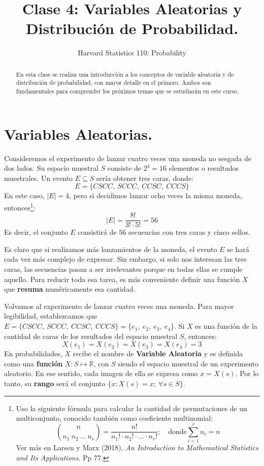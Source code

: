 \documentclass[12pt]{article}
\title{Clase 4: Variables Aleatorias y Distribución de Probabilidad.}
\author{Harvard Statistics 110: Probability}
\date{}
\begin{document}
\maketitle

\begin{abstract}
\noindent En esta clase se realiza una introducción a los conceptos de variable aleatoria y de distribución de probabilidad, con mayor detalle en el primero. Ambos son fundamentales para comprender los próximos temas que se estudiarán en este curso.
\end{abstract}

\newcommand{\R}{\mathbb{R}}

\section{Variables Aleatorias.}

Consideremos el experimento de lanzar cuatro veces una moneda no sesgada de dos lados. Su espacio muestral $S$ consiste de $2^{4} = 16$ elementos o resultados muestrales. Un evento $E \subseteq S$ sería obtener tres caras, donde:
\[
  E = \{CSCC, \ SCCC, \ CCSC, \ CCCS\}
\]
En este caso, $|E| = 4$, pero si decidimos lanzar ocho veces la misma moneda, entonces\footnote{Uso la siguiente fórmula para calcular la cantidad de permutaciones de un multiconjunto, conocido también como coeficiente multinomial:
\[
  \binom{n}{n_{1} \ n_{2} \ \ldots \ n_{r}} = \frac{n!}{n_{1}! \cdot n_{2}! \cdot \ldots \cdot n_{r}!};
  \quad \text{donde} \sum_{i = 1}^{r} n_{i} = n
\]
Ver más en Larsen y Marx (2018). \textit{An Introduction to Mathematical Statistics and Its Applications}. Pp 77.}:
\[
  |E| = \frac{8!}{3! \cdot 5!} = 56
\]
Es decir, el conjunto $E$ consistirá de $56$ secuencias con tres caras y cinco sellos.

Es claro que si realizamos más lanzamientos de la moneda, el evento $E$ se hará cada vez más complejo de expresar. Sin embargo, si solo nos interesan las tres caras, las secuencias pasan a ser irrelevantes porque en todas ellas se cumple aquello. Para reducir toda esa tarea, es más conveniente definir una función $X$ que \textbf{resuma} numéricamente esa cantidad.

Volvamos al experimento de lanzar cuatro veces una moneda. Para mayor legibilidad, establezcamos que $E = \{CSCC, \ SCCC, \ CCSC, \ CCCS\} = \{e_{1}, \ e_{2}, \ e_{3}, \ e_{4} \}$. Si $X$ es una función de la cantidad de caras de los resultados del espacio muestral $S$, entonces:
\[
  X(e_{1}) = X(e_{2}) = X(e_{3}) = X(e_{4}) = 3
\]
En probabilidades, $X$ recibe el nombre de \textbf{Variable Aleatoria} y es definida como una \textbf{función} $X \colon S \mapsto \R$, con $S$ siendo el espacio muestral de un experimento aleatorio. En ese sentido, cada imagen de ella se expresa como $x = X(s)$. Por lo tanto, su \textbf{rango} será el conjunto $\{x \colon X(s) = x; \ \forall s \in S\}$.
\end{document}
